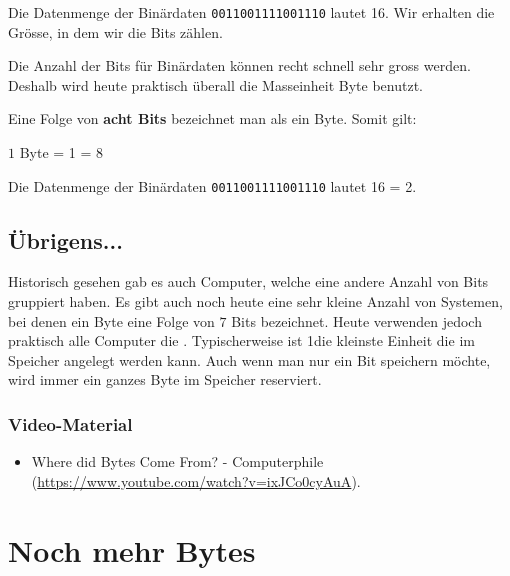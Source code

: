 \begin{example}
Die Datenmenge der Binärdaten \texttt{0011001111001110} lautet \qty{16}{\bit}. Wir erhalten die Grösse, in dem wir die Bits zählen.
\end{example}

Die Anzahl der Bits für Binärdaten können recht schnell sehr gross werden. Deshalb wird heute praktisch überall die Masseinheit Byte benutzt.

\begin{definition}[Byte]
Eine Folge von \textbf{acht Bits} bezeichnet man als ein Byte. Somit gilt:

\begin{center}
$1$ Byte = \qty{1}{\byte} = \qty{8}{\bit}
\end{center}

\end{definition}

\begin{example}
Die Datenmenge der Binärdaten \texttt{0011001111001110} lautet \qty{16}{\bit} = \qty{2}{\byte}.
\end{example}

\subsection{Übrigens...}

Historisch gesehen gab es auch Computer, welche eine andere Anzahl von Bits gruppiert haben. Es gibt auch noch heute eine sehr kleine Anzahl von Systemen, bei denen ein Byte eine Folge von $7$ Bits bezeichnet. Heute verwenden jedoch praktisch alle Computer die . Typischerweise ist \qty{1}{\byte}die kleinste Einheit die im Speicher angelegt werden kann. Auch wenn man nur ein Bit speichern möchte, wird immer ein ganzes Byte im Speicher reserviert. 

\subsubsection{Video-Material}

\begin{itemize}
\item Where did Bytes Come From? - Computerphile (\url{https://www.youtube.com/watch?v=ixJCo0cyAuA}).
\end{itemize}

\section{Noch mehr Bytes}
\label{sec-noch-mehr-bytes}

